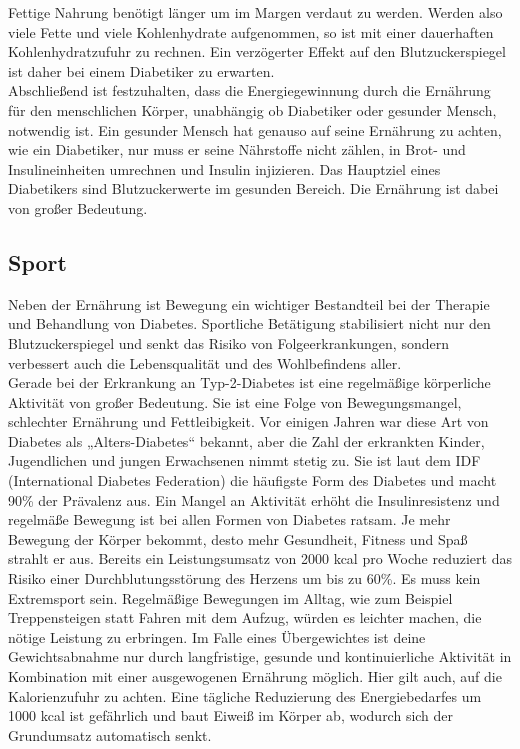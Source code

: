 		Fettige Nahrung benötigt länger um im Margen verdaut zu werden. Werden also viele Fette und viele Kohlenhydrate aufgenommen, so ist mit einer dauerhaften Kohlenhydratzufuhr zu rechnen. Ein verzögerter Effekt auf den Blutzuckerspiegel ist daher bei einem Diabetiker zu erwarten. \cite{SG}\\
		Abschließend ist festzuhalten, dass die Energiegewinnung durch die Ernährung für den menschlichen Körper, unabhängig ob Diabetiker oder gesunder Mensch, notwendig ist. Ein gesunder Mensch hat genauso auf seine Ernährung zu achten, wie ein Diabetiker, nur muss er seine Nährstoffe nicht zählen, in Brot- und Insulineinheiten umrechnen und Insulin injizieren. Das Hauptziel eines Diabetikers sind Blutzuckerwerte im gesunden Bereich. Die Ernährung ist dabei von großer Bedeutung.

\subsection{Sport}
	Neben der Ernährung ist Bewegung ein wichtiger Bestandteil bei der Therapie und Behandlung von Diabetes. Sportliche Betätigung stabilisiert nicht nur den Blutzuckerspiegel und senkt das Risiko von Folgeerkrankungen, sondern verbessert auch die Lebensqualität und des Wohlbefindens aller.\cite{SG}\\
	Gerade bei der Erkrankung an Typ-2-Diabetes ist eine regelmäßige körperliche Aktivität von großer Bedeutung. Sie ist eine Folge von Bewegungsmangel, schlechter Ernährung und Fettleibigkeit. Vor einigen Jahren war diese Art von Diabetes als „Alters-Diabetes“ bekannt, aber die Zahl der erkrankten Kinder, Jugendlichen und jungen Erwachsenen nimmt stetig zu. Sie ist laut dem IDF (International Diabetes Federation) die häufigste Form des Diabetes und macht 90\% der Prävalenz aus.\cite{IDF}\newline
	Ein Mangel an Aktivität erhöht die Insulinresistenz und regelmäße Bewegung ist bei allen Formen von Diabetes ratsam. Je mehr Bewegung der Körper bekommt, desto mehr Gesundheit, Fitness und Spaß strahlt er aus. Bereits ein Leistungsumsatz von 2000 kcal pro Woche reduziert das Risiko einer Durchblutungsstörung des Herzens um bis zu 60\%. Es muss kein Extremsport sein. Regelmäßige Bewegungen im Alltag, wie zum Beispiel Treppensteigen statt Fahren mit dem Aufzug, würden es leichter machen, die nötige Leistung zu erbringen. \newline
	Im Falle eines Übergewichtes ist deine Gewichtsabnahme nur durch langfristige, gesunde und kontinuierliche Aktivität in Kombination mit einer ausgewogenen Ernährung möglich. Hier gilt auch, auf die Kalorienzufuhr zu achten. Eine tägliche Reduzierung des Energiebedarfes um 1000 kcal ist gefährlich und baut Eiweiß im Körper ab, wodurch sich der Grundumsatz automatisch senkt.\newline 
